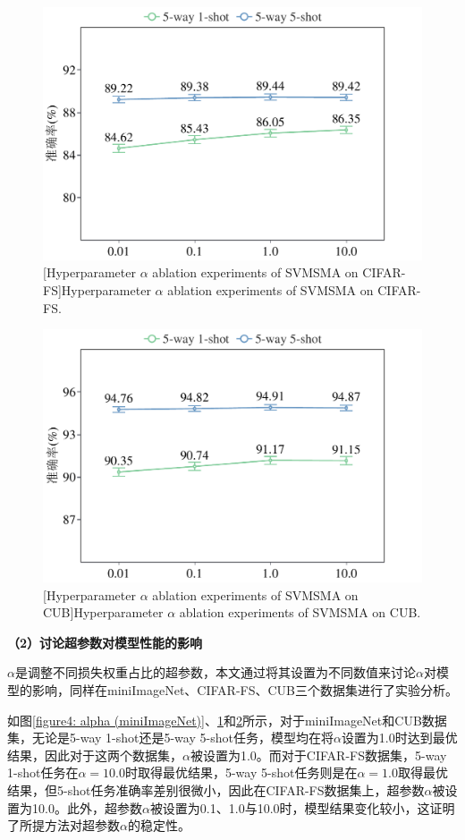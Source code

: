 \begin{figure}[h!]
  \centering
  \includegraphics[width=0.6\columnwidth]{figures/SVMSMA/CIFAR-FS/alpha.pdf}
  [Hyperparameter $\alpha$ ablation experiments of SVMSMA on CIFAR-FS]{Hyperparameter $\alpha$ ablation experiments of SVMSMA on CIFAR-FS.}
  \label{figure4: alpha (CIFAR-FS)}
\end{figure}

\begin{figure}[h!]
  \centering
  \includegraphics[width=0.6\columnwidth]{figures/SVMSMA/CUB/alpha.pdf}
  [Hyperparameter $\alpha$ ablation experiments of SVMSMA on CUB]{Hyperparameter $\alpha$ ablation experiments of SVMSMA on CUB.}
  \label{figure4: alpha (CUB)}
\end{figure}

\textbf{（2）讨论超参数对模型性能的影响}

$\alpha$是调整不同损失权重占比的超参数，本文通过将其设置为不同数值来讨论$\alpha$对模型的影响，同样在miniImageNet、CIFAR-FS、CUB三个数据集进行了实验分析。

如图\ref{figure4: alpha (miniImageNet)}、\ref{figure4: alpha (CIFAR-FS)}和\ref{figure4: alpha (CUB)}所示，对于miniImageNet和CUB数据集，无论是5-way 1-shot还是5-way 5-shot任务，模型均在将$\alpha$设置为1.0时达到最优结果，因此对于这两个数据集，$\alpha$被设置为1.0。而对于CIFAR-FS数据集，5-way 1-shot任务在$\alpha = 10.0$时取得最优结果，5-way 5-shot任务则是在$\alpha = 1.0$取得最优结果，但5-shot任务准确率差别很微小，因此在CIFAR-FS数据集上，超参数$\alpha$被设置为10.0。此外，超参数$\alpha$被设置为0.1、1.0与10.0时，模型结果变化较小，这证明了所提方法对超参数$\alpha$的稳定性。

